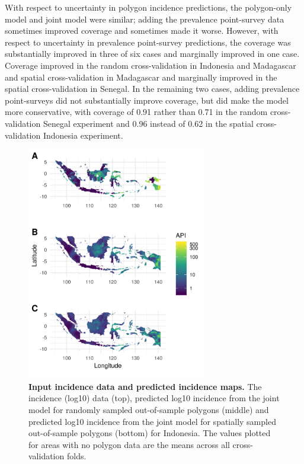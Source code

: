 \documentclass[10pt,letterpaper]{article}
\begin{document}
With respect to uncertainty in polygon incidence predictions, the polygon-only model and joint model were similar; adding the prevalence point-survey data sometimes improved coverage and sometimes made it worse.
However, with respect to uncertainty in prevalence point-survey predictions, the coverage was substantially improved in three of six cases and marginally improved in one case.
Coverage improved in the random cross-validation in Indonesia and Madagascar and spatial cross-validation in Madagascar and marginally improved in the spatial cross-validation in Senegal.
In the remaining two cases, adding prevalence point-surveys did not substantially improve coverage, but did make the model more conservative, with coverage of 0.91 rather than 0.71 in the random cross-validation Senegal experiment and 0.96 instead of 0.62 in the spatial cross-validation Indonesia experiment.














\begin{figure}
\includegraphics[width = 0.7\textwidth]{figures/idn_both_cv12_preds.png}
\caption{{\bf Input incidence data and predicted incidence maps. } 
The incidence (log10) data (top), predicted log10 incidence from the joint model for randomly sampled out-of-sample polygons (middle) and predicted log10 incidence from the joint model for spatially sampled out-of-sample polygons (bottom) for Indonesia. The values plotted for areas with no polygon data are the means across all cross-validation folds.
}
\label{predobsmapidn}
\end{figure}
\end{document}
